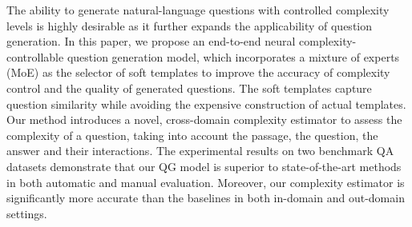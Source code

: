 The ability to generate natural-language questions with controlled complexity levels is highly desirable as it further expands the applicability of question generation. In this paper, we propose an end-to-end neural complexity-controllable question generation model, which incorporates a mixture of experts (MoE) as the selector of soft templates to improve the accuracy of complexity control and the quality of generated questions. The soft templates capture question similarity while avoiding the expensive construction of actual templates. Our method introduces a novel, cross-domain complexity estimator to assess the complexity of a question, taking into account the passage, the question, the answer and their interactions. The experimental results on two benchmark QA datasets demonstrate that our QG model is superior to state-of-the-art methods in both automatic and manual evaluation. Moreover, our complexity estimator is significantly more accurate than the baselines in both in-domain and out-domain settings.
